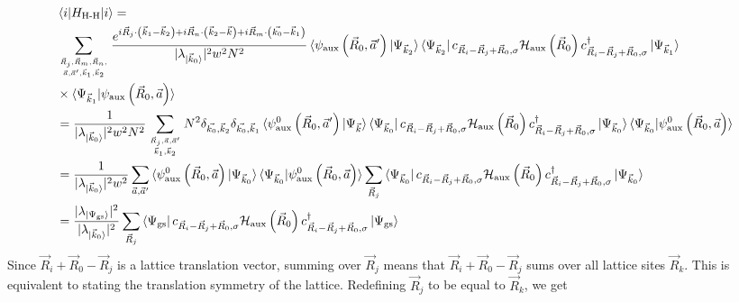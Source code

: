 \documentclass{report}
\numberwithin{equation}{section}
\begin{document}
\begin{equation}\begin{aligned}
	&\braket{i | H_\text{H-H} | i} =\\
	& \sum_{\vec R_j, \vec R_m, \vec R_n, \atop{\vec a, \vec a^\prime, \vec k_1, \vec k_2}} \frac{e^{i\vec{R}_j\cdot\left(\vec{k}_1 - \vec k_2\right) + i\vec{R}_n\cdot\left(\vec{k}_2 - \vec k\right) + i\vec{R}_m\cdot\left(\vec{k_0} - \vec k_1\right)}}{|\lambda_{\ket{\vec k_0}}|^2 w^2 N^2}  \braket{\psi_\text{aux}\left( \vec R_0, \vec a^\prime \right) | \Psi_{\vec k_2}}\bra{\Psi_{\vec k_2}} c_{\vec R_i - \vec R_j + \vec R_0,\sigma}\mathcal{H}_\text{aux}\left( \vec R_0 \right)c^\dagger_{\vec R_i - \vec R_j + \vec R_0,\sigma}\ket{\Psi_{\vec k_1}}\\
	&\times\braket{\Psi_{\vec k_1} | \psi_\text{aux}\left( \vec R_0, \vec a \right)}\\
	&= \frac{1}{|\lambda_{\ket{\vec k_0}}|^2 w^2 N^2} \sum_{\vec R_j, \vec a, \vec a^\prime \atop{\vec k_1,\vec k_2}} N^2 \delta_{\vec{k_0},\vec k_2} \delta_{\vec{k_0},\vec k_1} \braket{\psi^0_\text{aux}\left( \vec R_0, \vec a^\prime \right) | \Psi_{\vec k}}\bra{\Psi_{\vec k_0}} c_{\vec R_i - \vec R_j + \vec R_0,\sigma}\mathcal{H}_\text{aux}\left( \vec R_0 \right)c^\dagger_{\vec R_i - \vec R_j + \vec R_0,\sigma}\ket{\Psi_{\vec k_0}}\braket{\Psi_{\vec k_0} | \psi^0_\text{aux}\left( \vec R_0, \vec a \right)}\\
	&= \frac{1}{|\lambda_{\ket{\vec k_0}}|^2 w^2} \sum_{\vec a, \vec a^\prime} \braket{\psi^0_\text{aux}\left( \vec R_0, \vec a \right) | \Psi_{\vec k_0}} \braket{\Psi_{\vec k_0} | \psi^0_\text{aux}\left( \vec R_0, \vec a \right)} \sum_{\vec R_j} \bra{\Psi_{\vec k_0}} c_{\vec R_i - \vec R_j + \vec R_0,\sigma}\mathcal{H}_\text{aux}\left( \vec R_0 \right)c^\dagger_{\vec R_i - \vec R_j + \vec R_0,\sigma}\ket{\Psi_{\vec k_0}}\\
	&= \frac{|\lambda_{\ket{\Psi_\text{gs}}}|^2}{|\lambda_{\ket{\vec k_0}}|^2}\sum_{\vec R_j} \bra{\Psi_\text{gs}} c_{\vec R_i - \vec R_j + \vec R_0,\sigma}\mathcal{H}_\text{aux}\left( \vec R_0 \right)c^\dagger_{\vec R_i - \vec R_j + \vec R_0,\sigma}\ket{\Psi_\text{gs}}\\
\end{aligned}\end{equation}
Since \(\vec R_i + \vec R_0 - \vec R_j\) is a lattice translation vector, summing over \(\vec R_j\) means that \(\vec R_i + \vec R_0 - \vec R_j\) sums over all lattice sites \(\vec R_k\). This is equivalent to stating the translation symmetry of the lattice. Redefining \(\vec R_j\) to be equal to \(\vec R_k\), we get
\end{document}
